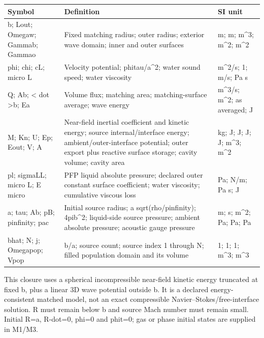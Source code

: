 \documentclass[11pt]{article}
\begin{document}
\begin{longtable}{p{.18\linewidth}p{.60\linewidth}p{.15\linewidth}}Symbol & Definition & SI unit\\\hline

b; Lout; Omegaw; Gammab; Gammao & Fixed matching radius; outer radius; exterior wave domain; inner and outer surfaces & m; m; m\textasciicircum{}3; m\textasciicircum{}2; m\textasciicircum{}2\\

phi; chi; cL;  micro L & Velocity potential; phitau/a\textasciicircum{}2; water sound speed; water viscosity & m\textasciicircum{}2/s; 1; m/s; Pa s\\

Q; Ab; < dot >b; Ea & Volume flux; matching area; matching-surface average; wave energy & m\textasciicircum{}3/s; m\textasciicircum{}2; as averaged; J\\

M; Kn; U; Ep; Eout; V; A & Near-field inertial coefficient and kinetic energy; source internal/interface energy; ambient/outer-interface potential; outer export plus reactive surface storage; cavity volume; cavity area & kg; J; J; J; J; m\textasciicircum{}3; m\textasciicircum{}2\\

pl; sigmaLL;  micro L; E micro  & PFP liquid absolute pressure; declared outer constant surface coefficient; water viscosity; cumulative viscous loss & Pa; N/m; Pa s; J\\

a; tau; Ab; pB; pinfinity; pac & Initial source radius; a sqrt(rho/pinfinity); 4pib\textasciicircum{}2; liquid-side source pressure; ambient absolute pressure; acoustic gauge pressure & m; s; m\textasciicircum{}2; Pa; Pa; Pa\\

bhat; N; j; Omegapop; Vpop & b/a; source count; source index 1 through N; filled population domain and its volume & 1; 1; 1; m\textasciicircum{}3; m\textasciicircum{}3\\

\end{longtable}

This closure uses a spherical incompressible near-field kinetic energy truncated at fixed b, plus a linear 3D wave potential outside b. It is a declared energy-consistent matched model, not an exact compressible Navier--Stokes/free-interface solution. R must remain below b and source Mach number must remain small. Initial R=a, R-dot=0, phi=0 and phit=0; gas or phase initial states are supplied in M1/M3.
\end{document}
